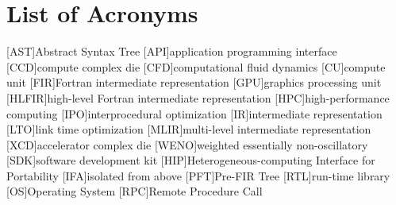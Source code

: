 \section*{List of Acronyms}

\begin{acronym}[paper]
[AST]{Abstract Syntax Tree}
[API]{application programming interface}
[CCD]{compute complex die}
[CFD]{computational fluid dynamics}
[CU]{compute unit}
[FIR]{Fortran intermediate representation}
[GPU]{graphics processing unit}
[HLFIR]{high-level Fortran intermediate representation}
[HPC]{high-performance computing}
[IPO]{interprocedural optimization}
[IR]{intermediate representation}
[LTO]{link time optimization}
[MLIR]{multi-level intermediate representation}
[XCD]{accelerator complex die}
[WENO]{weighted essentially non-oscillatory}
[SDK]{software development kit}
[HIP]{Heterogeneous-computing Interface for Portability}
[IFA]{isolated from above}
[PFT]{Pre-FIR Tree}
[RTL]{run-time library}
[OS]{Operating System}
[RPC]{Remote Procedure Call}
\end{acronym}